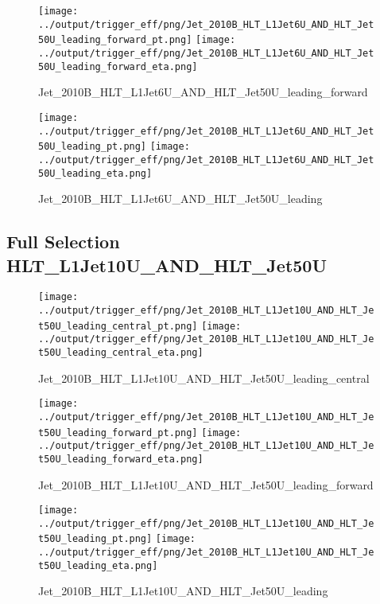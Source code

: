 \documentclass[11pt]{article}
\begin{document}
\begin{figure}[ht]
\centering
\texttt{[image: ../output/trigger\_eff/png/Jet\_2010B\_HLT\_L1Jet6U\_AND\_HLT\_Jet50U\_leading\_forward\_pt.png]}
\texttt{[image: ../output/trigger\_eff/png/Jet\_2010B\_HLT\_L1Jet6U\_AND\_HLT\_Jet50U\_leading\_forward\_eta.png]}
\caption{Jet\_2010B\_HLT\_L1Jet6U\_AND\_HLT\_Jet50U\_leading\_forward}
\label{fig:jet_L1Jet6U_AND_HLT_Jet50U_leading_forward}
\end{figure}

\begin{figure}[ht]
\centering
\texttt{[image: ../output/trigger\_eff/png/Jet\_2010B\_HLT\_L1Jet6U\_AND\_HLT\_Jet50U\_leading\_pt.png]}
\texttt{[image: ../output/trigger\_eff/png/Jet\_2010B\_HLT\_L1Jet6U\_AND\_HLT\_Jet50U\_leading\_eta.png]}
\caption{Jet\_2010B\_HLT\_L1Jet6U\_AND\_HLT\_Jet50U\_leading}
\label{fig:jet_L1Jet6U_AND_HLT_Jet50U_leading}
\end{figure}


\newpage
\subsection{Full Selection HLT\_L1Jet10U\_AND\_HLT\_Jet50U}
\begin{figure}[ht]
\centering
\texttt{[image: ../output/trigger\_eff/png/Jet\_2010B\_HLT\_L1Jet10U\_AND\_HLT\_Jet50U\_leading\_central\_pt.png]}
\texttt{[image: ../output/trigger\_eff/png/Jet\_2010B\_HLT\_L1Jet10U\_AND\_HLT\_Jet50U\_leading\_central\_eta.png]}
\caption{Jet\_2010B\_HLT\_L1Jet10U\_AND\_HLT\_Jet50U\_leading\_central}
\label{fig:jet_L1Jet10U_AND_HLT_Jet50U_leading_central}
\end{figure}

\begin{figure}[ht]
\centering
\texttt{[image: ../output/trigger\_eff/png/Jet\_2010B\_HLT\_L1Jet10U\_AND\_HLT\_Jet50U\_leading\_forward\_pt.png]}
\texttt{[image: ../output/trigger\_eff/png/Jet\_2010B\_HLT\_L1Jet10U\_AND\_HLT\_Jet50U\_leading\_forward\_eta.png]}
\caption{Jet\_2010B\_HLT\_L1Jet10U\_AND\_HLT\_Jet50U\_leading\_forward}
\label{fig:jet_L1Jet10U_AND_HLT_Jet50U_leading_forward}
\end{figure}

\begin{figure}[ht]
\centering
\texttt{[image: ../output/trigger\_eff/png/Jet\_2010B\_HLT\_L1Jet10U\_AND\_HLT\_Jet50U\_leading\_pt.png]}
\texttt{[image: ../output/trigger\_eff/png/Jet\_2010B\_HLT\_L1Jet10U\_AND\_HLT\_Jet50U\_leading\_eta.png]}
\caption{Jet\_2010B\_HLT\_L1Jet10U\_AND\_HLT\_Jet50U\_leading}
\label{fig:jet_L1Jet10U_AND_HLT_Jet50U_leading}
\end{figure}

\cleardoublepage

 
\end{document}
